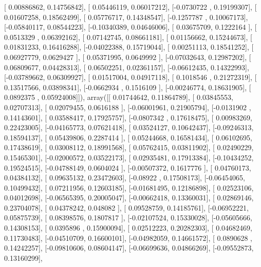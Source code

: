 \documentclass{article}
\begin{document}
       [ 0.00886862,  0.14756842],
       [ 0.05446119,  0.06017212],
       [-0.0730722 ,  0.19199307],
       [ 0.01607258,  0.18562499],
       [ 0.05776717,  0.14348547],
       [-0.1257787 ,  0.10067173],
       [-0.05840117,  0.08544223],
       [-0.10340389,  0.04646006],
       [ 0.03675709,  0.1222164 ],
       [ 0.0513329 ,  0.06392162],
       [ 0.07142745,  0.08661181],
       [ 0.01156662,  0.15244673],
       [ 0.01831233,  0.16416288],
       [-0.04022388,  0.15719044],
       [ 0.00251113,  0.18541252],
       [ 0.06927779,  0.0629427 ],
       [ 0.05371995,  0.0649992 ],
       [-0.07032643,  0.12987202],
       [ 0.06809677,  0.04428313],
       [ 0.06502251,  0.02361157],
       [-0.06612435,  0.14322993],
       [-0.03789662,  0.06309927],
       [ 0.01517004,  0.04917118],
       [ 0.1018546 ,  0.21272319],
       [ 0.13517566,  0.03898341],
       [-0.0662934 ,  0.1516109 ],
       [-0.00246774,  0.18631905],
       [ 0.0892375 ,  0.05924008]]), array([[ 0.01744642,  0.11864789],
       [ 0.03845553,  0.02707313],
       [ 0.02079455,  0.0616188 ],
       [-0.06001961,  0.21905794],
       [-0.0131902 ,  0.14143601],
       [ 0.03588417,  0.17925757],
       [-0.0807342 ,  0.17618475],
       [ 0.00983269,  0.22423005],
       [-0.04165773,  0.07621418],
       [ 0.03524127,  0.10642437],
       [-0.09246313,  0.18594137],
       [ 0.05439806,  0.2287414 ],
       [ 0.05244668,  0.16581434],
       [ 0.06102695,  0.17438619],
       [ 0.03008112,  0.18991568],
       [ 0.05762415,  0.03811902],
       [ 0.02490229,  0.15465301],
       [-0.02000572,  0.03522173],
       [ 0.02935481,  0.17913384],
       [-0.10434252,  0.19524515],
       [-0.04788149,  0.0604024 ],
       [-0.00507372,  0.1617776 ],
       [ 0.04760173,  0.04384132],
       [ 0.09635132,  0.23472603],
       [-0.08922   ,  0.17508173],
       [-0.06454065,  0.10499432],
       [ 0.07211956,  0.12603185],
       [-0.01681495,  0.12186898],
       [ 0.02523106,  0.04012698],
       [-0.06565395,  0.20005047],
       [-0.00662418,  0.13360031],
       [ 0.02869146,  0.23704078],
       [ 0.04378242,  0.048082  ],
       [ 0.09528759,  0.14185761],
       [-0.06952221,  0.05875739],
       [ 0.08398576,  0.1807817 ],
       [-0.02107524,  0.15330028],
       [-0.05605666,  0.14308153],
       [ 0.0395896 ,  0.15900094],
       [ 0.02512223,  0.20282303],
       [ 0.04682469,  0.11730483],
       [-0.04510709,  0.16600101],
       [-0.04982059,  0.14661572],
       [ 0.0890628 ,  0.14242257],
       [-0.09810606,  0.08604147],
       [-0.06699636,  0.04866269],
       [-0.09552873,  0.13160299],
\end{document}
